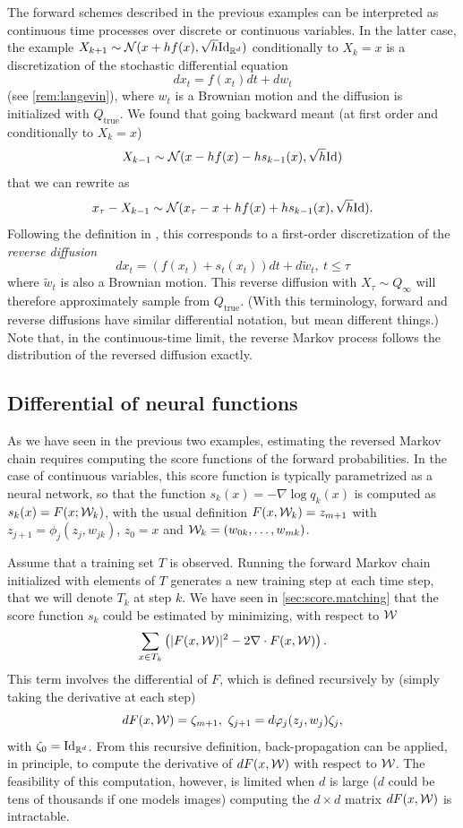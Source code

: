 The forward schemes described in the previous examples can be interpreted as continuous time processes over discrete or continuous variables. In the latter case, the example $X_{k+1} \sim \CN(x + h f(x), \sqrt h \Id[d])$ conditionally to $X_k = x$ is a discretization of the stochastic differential equation 
\[
dx_t = f(x_t) dt + dw_t
\]
(see \cref{rem:langevin}), where $w_t$ is a Brownian motion and the diffusion is initialized with $Q_{\mathrm{true}}$. We found that going backward meant (at first order and conditionally to $X_k=x$)
\[
X_{k-1} \sim \CN(x - h f(x) - h s_{k-1}(x), \sqrt h \Id)
\]
that we can rewrite as
\[
x_\tau - X_{k-1} \sim \CN(x_\tau - x + h f(x) + h s_{k-1}(x), \sqrt h \Id).
\]
Following the definition in \citet{anderson1982reverse}, this corresponds to a first-order discretization of the {\em reverse diffusion}
\[
dx_t = (f(x_t) + s_t(x_t)) dt + d\tilde w_t,\ t\leq \tau
\]
where $\tilde w_t$ is also a Brownian motion. This reverse diffusion with $X_\tau \sim Q_\infty$ will therefore approximately sample from $Q_{\mathrm{true}}$. (With this terminology, forward and reverse diffusions have similar differential notation, but mean different things.) Note that, in the continuous-time limit, the reverse Markov process follows the distribution of the reversed diffusion exactly.


\subsection{Differential of neural functions}

As we have seen in the previous two examples, estimating the reversed Markov chain requires computing the score functions of the forward probabilities. In the case of continuous variables, this score function is typically parametrized as  a neural network, so that the function $s_k(x) = -\nabla \log q_k(x)$ is computed as $s_k(x) = F(x;{\mathcal W}_k)$, with the usual definition $F(x, {\mathcal W}_k) = z_{m+1}$ with $z_{j+1} = \phi_j(z_j, w_{jk})$, $z_0 = x$ and ${\mathcal W}_k =  (w_{0k}, \ldots, w_{mk})$. 

Assume that a training set $T$ is observed. Running the forward Markov chain initialized with elements of $T$ generates a new training step at each time step, that we will denote $T_k$ at step $k$. We have seen in \cref{sec:score.matching} that the score function $s_k$ could be estimated by minimizing, with respect to ${\mathcal W}$
\[
 \sum_{x\in T_k} \left(|F(x,{\mathcal W}) |^2  - 2\nabla \cdot  F(x,{\mathcal W})\right).
\]
This term involves the differential of $F$, which is defined recursively by (simply taking the derivative at each step)
\[
dF(x, \CW) = \zeta_{m+1}, \ \zeta_{j+1} = d\phi_j(z_j, w_{j})\zeta_j,
\]
 with $\zeta_0 = \Id[d]$. From this recursive definition, back-propagation can be applied, in principle, to compute the derivative of $dF(x, {\mathcal W})$ with respect to ${\mathcal W}$.  The feasibility of this computation, however, is limited when $d$ is large ($d$ could be tens of thousands if one models images) computing the $d\times d$ matrix $dF(x, {\mathcal W})$ is intractable. 
 
